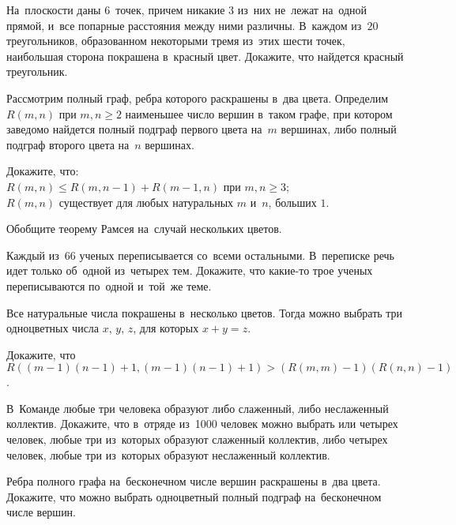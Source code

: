 


\begin{problems}

\item
На~плоскости даны $6$~точек, причем никакие $3$ из~них не~лежат на~одной
прямой, и~все попарные расстояния между ними различны.
В~каждом из~$20$ треугольников, образованном некоторыми тремя из~этих шести
точек, наибольшая сторона покрашена в~красный цвет.
Докажите, что найдется красный треугольник.

\end{problems}

Рассмотрим полный граф, ребра которого раскрашены в~два цвета.
Определим $R(m,n)$ при $m, n \geq 2$ наименьшее число вершин в~таком графе,
при котором заведомо найдется полный подграф первого цвета на~$m$ вершинах,
либо полный подграф второго цвета на~$n$ вершинах.

\begin{problems}

\item{}
Докажите, что:
\\
\subproblem
$R(m, n) \leq R(m, n - 1) + R(m - 1, n)$ при $m,n \geq 3$;
\\
\subproblem
$R(m, n)$ существует для любых натуральных $m$ и~$n$, больших $1$.

\item
Обобщите теорему Рамсея на~случай нескольких цветов.

\item
Каждый из~$66$ ученых переписывается со~всеми остальными.
В~переписке речь идет только об~одной из~четырех тем.
Докажите, что какие-то трое ученых переписываются по~одной и~той~же теме.

\item{}
Все натуральные числа покрашены в~несколько цветов.
Тогда можно выбрать три одноцветных числа $x$, $y$, $z$, для которых
$x + y = z$.

\item
Докажите, что
\(
    R((m - 1) (n - 1) + 1, (m - 1) (n - 1) + 1) > (R(m, m) - 1) (R(n, n) - 1)
\).

\item
В~Команде любые три человека образуют либо слаженный, либо
неслаженный коллектив.
Докажите, что в~отряде из~1000 человек можно выбрать или четырех человек, любые
три из~которых образуют слаженный коллектив, либо четырех человек, любые три
из~которых образуют неслаженный коллектив.

\item
Ребра полного графа на~бесконечном числе вершин раскрашены в~два цвета.
Докажите, что можно выбрать одноцветный полный подграф на~бесконечном числе
вершин.

\end{problems}

